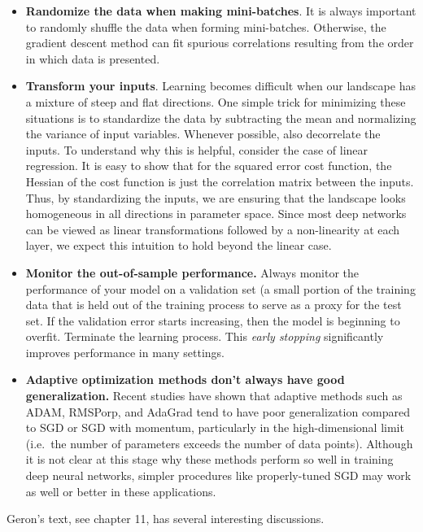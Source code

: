 \documentclass[%
oneside,                 %
final,                   %
10pt]{article}
\begin{document}
\begin{itemize}
\item \textbf{Randomize the data when making mini-batches}. It is always important to randomly shuffle the data when forming mini-batches. Otherwise, the gradient descent method can fit spurious correlations resulting from the order in which data is presented.

\item \textbf{Transform your inputs}. Learning becomes difficult when our landscape has a mixture of steep and flat directions. One simple trick for minimizing these situations is to standardize the data by subtracting the mean and normalizing the variance of input variables. Whenever possible, also decorrelate the inputs. To understand why this is helpful, consider the case of linear regression. It is easy to show that for the squared error cost function, the Hessian of the cost function is just the correlation matrix between the inputs. Thus, by standardizing the inputs, we are ensuring that the landscape looks homogeneous in all directions in parameter space. Since most deep networks can be viewed as linear transformations followed by a non-linearity at each layer, we expect this intuition to hold beyond the linear case.

\item \textbf{Monitor the out-of-sample performance.} Always monitor the performance of your model on a validation set (a small portion of the training data that is held out of the training process to serve as a proxy for the test set. If the validation error starts increasing, then the model is beginning to overfit. Terminate the learning process. This \emph{early stopping} significantly improves performance in many settings.

\item \textbf{Adaptive optimization methods don't always have good generalization.} Recent studies have shown that adaptive methods such as ADAM, RMSPorp, and AdaGrad tend to have poor generalization compared to SGD or SGD with momentum, particularly in the high-dimensional limit (i.e.~the number of parameters exceeds the number of data points). Although it is not clear at this stage why these methods perform so well in training deep neural networks, simpler procedures like properly-tuned SGD may work as well or better in these applications.
\end{itemize}

\noindent
Geron's text, see chapter 11, has several interesting discussions.
\end{document}
